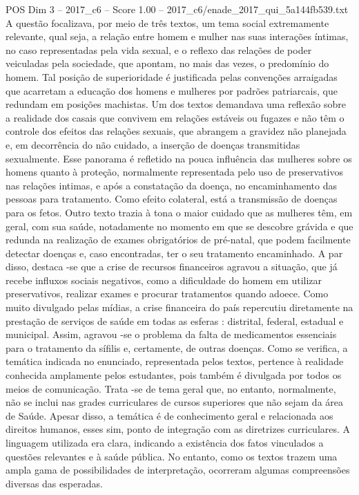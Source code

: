 \begin{textsample}{POS Dim 3 – 2017\_c6 – Score 1.00 – 2017\_c6/enade\_2017\_qui\_5a144fb539.txt}
A questão focalizava, por meio de três textos, um tema social extremamente relevante, qual seja, a relação entre homem e mulher nas suas interações íntimas, no caso representadas pela vida sexual, e o reflexo das relações de poder veiculadas pela sociedade, que apontam, no mais das vezes, o predomínio do homem.
Tal posição de superioridade é justificada pelas convenções arraigadas que acarretam a educação dos homens e mulheres por padrões patriarcais, que redundam em posições machistas.
Um dos textos demandava uma reflexão sobre a realidade dos casais que convivem em relações estáveis ou fugazes e não têm o controle dos efeitos das relações sexuais, que abrangem a gravidez não planejada e, em decorrência do não cuidado, a inserção de doenças transmitidas sexualmente.
Esse panorama é refletido na pouca influência das mulheres sobre os homens quanto à proteção, normalmente representada pelo uso de preservativos nas relações intimas, e após a constatação da doença, no encaminhamento das pessoas para tratamento.
Como efeito colateral, está a transmissão de doenças para os fetos.
Outro texto trazia à tona o maior cuidado que as mulheres têm, em geral, com sua saúde, notadamente no momento em que se descobre grávida e que redunda na realização de exames obrigatórios de pré-natal, que podem facilmente detectar doenças e, caso encontradas, ter o seu tratamento encaminhado.
A par disso, destaca -se que a crise de recursos financeiros agravou a situação, que já recebe influxos sociais negativos, como a dificuldade do homem em utilizar preservativos, realizar exames e procurar tratamentos quando adoece.
Como muito divulgado pelas mídias, a crise financeira do país repercutiu diretamente na prestação de serviços de saúde em todas as esferas : distrital, federal, estadual e municipal.
Assim, agravou -se o problema da falta de medicamentos essenciais para o tratamento da sífilis e, certamente, de outras doenças.
Como se verifica, a temática indicada no enunciado, representada pelos textos, pertence à realidade conhecida amplamente pelos estudantes, pois também é divulgada por todos os meios de comunicação.
Trata -se de tema geral que, no entanto, normalmente, não se inclui nas grades curriculares de cursos superiores que não sejam da área de Saúde.
Apesar disso, a temática é de conhecimento geral e relacionada aos direitos humanos, esses sim, ponto de integração com as diretrizes curriculares.
A linguagem utilizada era clara, indicando a existência dos fatos vinculados a questões relevantes e à saúde pública.
No entanto, como os textos trazem uma ampla gama de possibilidades de interpretação, ocorreram algumas compreensões diversas das esperadas.

\end{textsample}
